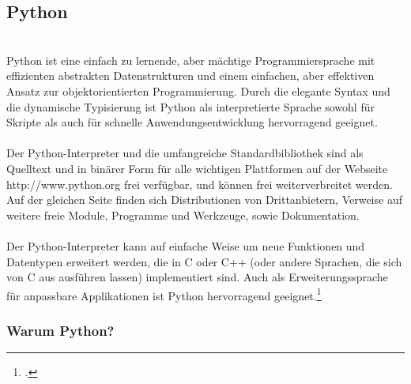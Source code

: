 \subsection{Python}\ \\
\noindent
Python ist eine einfach zu lernende, aber mächtige Programmiersprache mit effizienten abstrakten Datenstrukturen und einem einfachen, aber effektiven Ansatz zur objektorientierten Programmierung. Durch die elegante Syntax und die dynamische Typisierung ist Python als interpretierte Sprache sowohl für Skripte als auch für schnelle Anwendungsentwicklung hervorragend geeignet.\\
\\
Der Python-Interpreter und die umfangreiche Standardbibliothek sind als Quelltext und in binärer Form für alle wichtigen Plattformen auf der Webseite http://www.python.org frei verfügbar, und können frei weiterverbreitet werden. Auf der gleichen Seite finden sich Distributionen von Drittanbietern, Verweise auf weitere freie Module, Programme und Werkzeuge, sowie Dokumentation.\\
\\
Der Python-Interpreter kann auf einfache Weise um neue Funktionen und Datentypen erweitert werden, die in C oder C++ (oder andere Sprachen, die sich von C aus ausführen lassen) implementiert sind. Auch als Erweiterungssprache für anpassbare Applikationen ist Python hervorragend geeignet.\footcite{python_tutorial_intro}


\subsubsection{Warum Python?}

